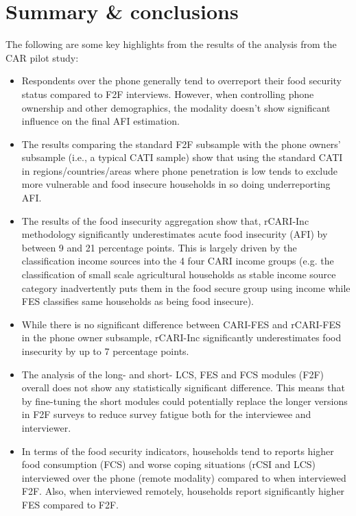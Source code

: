 \documentclass[11pt,harvard]{article}
\begin{document}
\pagebreak

	
\section{Summary \& conclusions}
		
The following are some key highlights from the results of the analysis from the CAR pilot study:

	\begin{itemize}[left=2.5em]
		\item Respondents over the phone generally tend to overreport their food security status compared to F2F interviews. However, when controlling phone ownership and other demographics, the modality doesn’t show significant influence on the final AFI estimation.
		\item 	The results comparing the standard F2F subsample with the phone owners’ subsample (i.e., a typical CATI sample) show that using the standard CATI in regions/countries/areas where phone penetration is low tends to exclude more vulnerable and food insecure households in so doing underreporting AFI.
		\item The results of the food insecurity aggregation show that, rCARI-Inc methodology significantly underestimates acute food insecurity (AFI) by between 9 and 21 percentage points. This is largely driven by the classification  income sources into the 4 four CARI income groups (e.g. the classification of small scale agricultural households as stable income source category inadvertently puts them in the food secure group  using income while FES classifies same households as being food insecure).
		\item While there is no significant difference between CARI-FES and rCARI-FES in the phone owner subsample, rCARI-Inc significantly underestimates food insecurity by up to 7 percentage points.
		\item The analysis of the long- and short- LCS, FES and FCS modules (F2F) overall does not show any statistically significant difference. This means that by fine-tuning the short modules could potentially replace the longer versions in F2F surveys to reduce survey fatigue both for the interviewee and interviewer.
		\item In terms of the food security indicators,  households tend to  reports higher food consumption (FCS) and worse coping situations (rCSI and LCS)  interviewed over the phone (remote modality) compared to when interviewed F2F. Also, when interviewed remotely, households report significantly higher FES compared to F2F. 
	
	
	\end{itemize}
	
\end{document}
